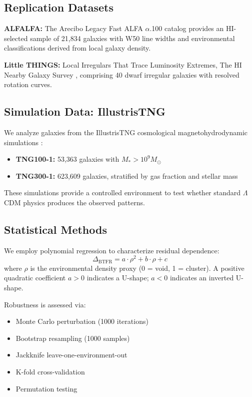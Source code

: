 \documentclass[12pt,a4paper]{article}
\begin{document}
\subsection{Replication Datasets}

\textbf{ALFALFA:} The Arecibo Legacy Fast ALFA $\alpha$.100 catalog \citep{Haynes2018} provides an HI-selected sample of 21,834 galaxies with W50 line widths and environmental classifications derived from local galaxy density.

\textbf{Little THINGS:} Local Irregulars That Trace Luminosity Extremes, The HI Nearby Galaxy Survey \citep{Hunter2012}, comprising 40 dwarf irregular galaxies with resolved rotation curves.

\subsection{Simulation Data: IllustrisTNG}

We analyze galaxies from the IllustrisTNG cosmological magnetohydrodynamic simulations \citep{Pillepich2018}:
\begin{itemize}
    \item \textbf{TNG100-1:} 53,363 galaxies with $M_* > 10^9 M_\odot$
    \item \textbf{TNG300-1:} 623,609 galaxies, stratified by gas fraction and stellar mass
\end{itemize}

These simulations provide a controlled environment to test whether standard $\Lambda$CDM physics produces the observed patterns.

\subsection{Statistical Methods}

We employ polynomial regression to characterize residual dependence:
\begin{equation}
\Delta_{\text{BTFR}} = a \cdot \rho^2 + b \cdot \rho + c
\end{equation}
where $\rho$ is the environmental density proxy (0 = void, 1 = cluster). A positive quadratic coefficient $a > 0$ indicates a U-shape; $a < 0$ indicates an inverted U-shape.

Robustness is assessed via:
\begin{itemize}
    \item Monte Carlo perturbation (1000 iterations)
    \item Bootstrap resampling (1000 samples)
    \item Jackknife leave-one-environment-out
    \item K-fold cross-validation
    \item Permutation testing
\end{itemize}
\end{document}
